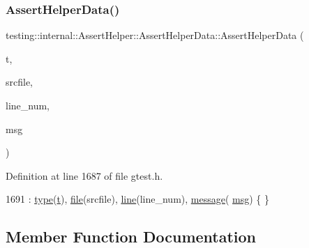 \subsubsection{\texorpdfstring{Assert\+Helper\+Data()}{AssertHelperData()}}
{\footnotesize\ttfamily testing\+::internal\+::\+Assert\+Helper\+::\+Assert\+Helper\+Data\+::\+Assert\+Helper\+Data (\begin{DoxyParamCaption}\item[{\hyperlink{classtesting_1_1TestPartResult_a65ae656b33fdfdfffaf34858778a52d5}{Test\+Part\+Result\+::\+Type}}]{t,  }\item[{const char $\ast$}]{srcfile,  }\item[{int}]{line\+\_\+num,  }\item[{const char $\ast$}]{msg }\end{DoxyParamCaption})\hspace{0.3cm}{\ttfamily [inline]}}



Definition at line 1687 of file gtest.\+h.


\begin{DoxyCode}
1691         : \hyperlink{structtesting_1_1internal_1_1AssertHelper_1_1AssertHelperData_a7b1d1a77882cd82107acea856d45692f}{type}(\hyperlink{namespacebattery__monitor__node_a7a63d20d1ea461e280f4eb5b47f925cd}{t}), \hyperlink{structtesting_1_1internal_1_1AssertHelper_1_1AssertHelperData_a639ae4acc706e919b101786f71e9dc15}{file}(srcfile), \hyperlink{structtesting_1_1internal_1_1AssertHelper_1_1AssertHelperData_aff816673320ecd035288dffe44760f90}{line}(line\_num), \hyperlink{structtesting_1_1internal_1_1AssertHelper_1_1AssertHelperData_ae81536d57b8deb5dca4159cc6f7efdf0}{message}(
      \hyperlink{namespacebattery__monitor__node_ab1920c64448816edd4064e494275fdff}{msg}) \{ \}
\end{DoxyCode}


\subsection{Member Function Documentation}
\mbox{\label{structtesting_1_1internal_1_1AssertHelper_1_1AssertHelperData_a5cfdd2fca371e33566ffdb2357606df2}} 
